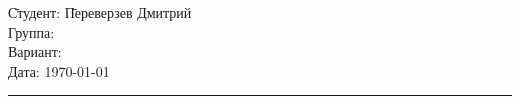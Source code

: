 \begin{tabbing}
	\hspace{10cm} \= Студент: \= Переверзев Дмитрий \\
	\> Группа:  \\
	\> Вариант:  \\
	\> Дата: \> \today
\end{tabbing}
\hrule
\vspace{1cm}